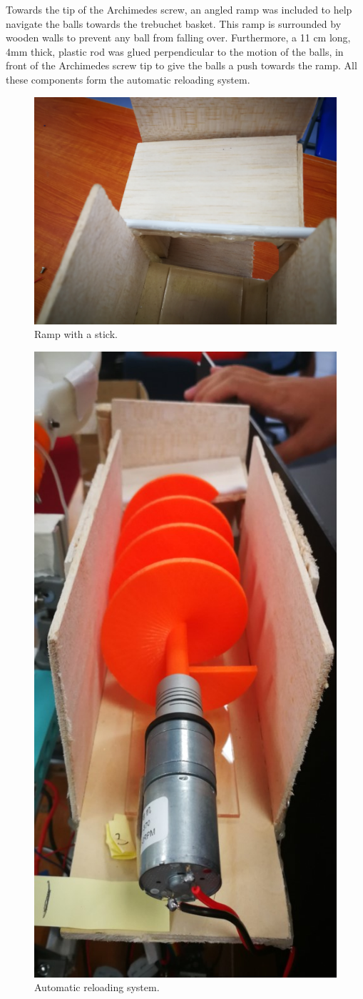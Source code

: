 \documentclass{article}
\begin{document}
Towards the tip of the Archimedes screw, an angled ramp was included to help navigate the balls towards the trebuchet basket. This ramp is surrounded by wooden walls to prevent any ball from falling over. Furthermore, a 11 cm long, 4mm thick, plastic rod was glued perpendicular to the motion of the balls, in front of the Archimedes screw tip to give the balls a push towards the ramp. All these components form the automatic reloading system.
\begin{figure}[H]
\centering
\includegraphics[width=0.5\linewidth]{sti}
\caption{Ramp with a stick.}
\end{figure}

\begin{figure}[H]
\centering
\includegraphics[width=0.4\linewidth]{Screw2}
\caption{Automatic reloading system.}
\end{figure}
\end{document}
